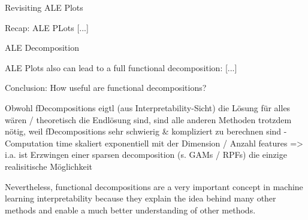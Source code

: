 \documentclass[11pt,compress,t,notes=noshow, aspectratio=169, xcolor=table]{beamer}
\begin{document}
    

\begin{frame}{Revisiting ALE Plots}

    Recap: ALE PLots [...]
    
\end{frame}

\begin{frame}{ALE Decomposition}
    
    ALE Plots also can lead to a full functional decomposition: [...]
    
\end{frame}

    


    

\begin{frame}{Conclusion: How useful are functional decompositions?}

    Obwohl fDecompositions eigtl (aus Interpretability-Sicht) die Lösung für alles wären / theoretisch die Endlösung sind, sind alle anderen Methoden trotzdem nötig, weil fDecompositions sehr schwierig \& kompliziert zu berechnen sind
    - Computation time skaliert exponentiell mit der Dimension / Anzahl features  =>  i.a. ist Erzwingen einer sparsen decomposition (s. GAMs / RPFs) die einzige realisitische Möglichkeit

    Nevertheless, functional decompositions are a very important concept in machine learning interpretability because they explain the idea behind many other methods and enable a much better understanding of other methods.
    
\end{frame}










\endlecture
\end{document}
